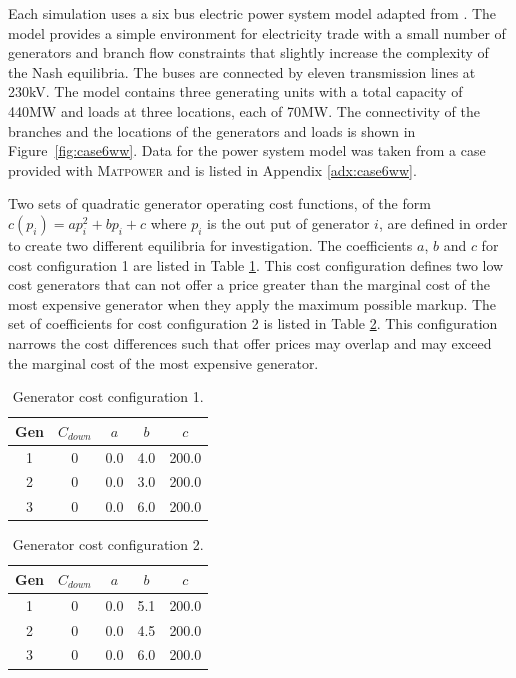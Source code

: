 Each simulation uses a six bus electric power system model adapted from
.  The model provides a simple
environment for electricity trade with a small number of generators and branch
flow constraints that slightly increase the complexity of the Nash equilibria.
The buses are connected by eleven transmission lines at 230kV. The model
contains three generating units with a total capacity of 440MW and loads at
three locations, each of 70MW. The connectivity of the branches and the
locations of the generators and loads is shown in Figure~\ref{fig:case6ww}. Data
for the power system model was taken from a case provided with \textsc{Matpower}
and is listed in Appendix \ref{adx:case6ww}.

Two sets of quadratic generator operating cost functions, of the form
$c(p_i)=ap_i^2+bp_i+c$ where $p_i$ is the out put of generator $i$, are defined
in order to create two different equilibria for investigation.  The coefficients
$a$, $b$ and $c$ for cost configuration 1 are listed in Table
\ref{tbl:case6ww_gencost1}.  This cost configuration defines two low cost
generators that can not offer a price greater than the marginal cost of the most
expensive generator when they apply the maximum possible markup. The set of
coefficients for cost configuration 2 is listed in Table
\ref{tbl:case6ww_gencost2}.  This configuration narrows the cost differences
such that offer prices may overlap and may exceed the marginal cost of the most
expensive generator.


\begin{table}
\begin{center}
\begin{tabular}{c|c|c|c|c}
\hline
Gen &$C_{down}$ &$a$ &$b$ &$c$ \\
\hline\hline
 1 &0 &0.0 &4.0 &200.0 \\
 2 &0 &0.0 &3.0 &200.0 \\
 3 &0 &0.0 &6.0 &200.0 \\
\hline
\end{tabular}
\caption{Generator cost configuration 1.}
\label{tbl:case6ww_gencost1}
\end{center}
\end{table}

\begin{table}
\begin{center}
\begin{tabular}{c|c|c|c|c}
\hline
Gen &$C_{down}$ &$a$ &$b$ &$c$ \\
\hline\hline
 1 &0 &0.0 &5.1 &200.0 \\
 2 &0 &0.0 &4.5 &200.0 \\
 3 &0 &0.0 &6.0 &200.0 \\
\hline
\end{tabular}
\caption{Generator cost configuration 2.}
\label{tbl:case6ww_gencost2}
\end{center}
\end{table}

